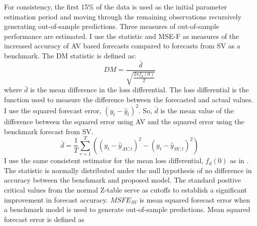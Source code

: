 For consistency, the first 15\% of the data is used as the initial parameter estimation period and  moving through the remaining  observations recursively generating out-of-sample predictions. Three measures of out-of-sample performance are estimated.
I use the \citet{Diebold1995} statistic and \citet{mccracken_asymptotics_2007} MSE-F as measures of the increased accuracy of AV based forecasts compared to forecasts from SV as a benchmark. The DM statistic is defined as:
\begin{equation}
	DM = \frac{\bar{d}}{\sqrt{\frac{2\pi f_{d}(0)}{T}}}
\end{equation}
where $\bar{d}$ is the mean difference in the loss differential. The loss differential is the function used to measure the difference between the forecasted and actual values. I use the squared forecast error, $(y_{t} - \hat{y}_{t})^{2}$. So, $\bar{d}$ is the mean value of the difference between the squared error using AV and the squared error using the benchmark forecast from SV.
\begin{equation}
	\bar{d} = \frac{1}{T}\sum^{T}_{\tau=1}((y_{t} - \hat{y}_{AV,t})^{2} - (y_{t} - \hat{y}_{SV,t})^{2})
\end{equation}
I use the same consistent estimator for the mean loss differential, $f_{d}(0)$ as in \citet{Diebold1995}. The statistic is normally distributed under the null hypothesis of no difference in accuracy between the benchmark and proposed model. The standard positive critical values from the normal Z-table serve as cutoffs to establish a significant improvement in forecast accuracy. $MSFE_{SV}$ is mean squared forecast error when a benchmark model is used to generate out-of-sample predictions. Mean squared forecast error is defined as
